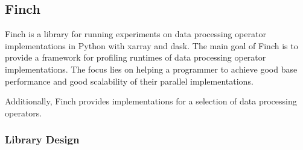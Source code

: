 \subsection{Finch}

Finch is a library for running experiments on data processing operator implementations in Python with xarray and dask.
The main goal of Finch is to provide a framework for profiling runtimes of data processing operator implementations.
The focus lies on helping a programmer to achieve good base performance and good scalability of their parallel implementations.

Additionally, Finch provides implementations for a selection of data processing operators.

\subsubsection{Library Design}
